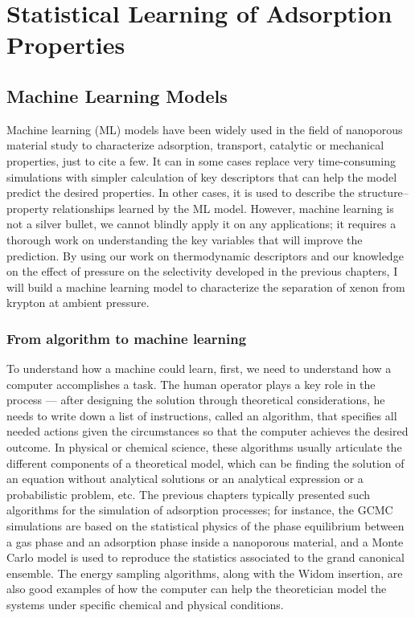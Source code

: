 \documentclass[main]{subfiles}
\begin{document}
\chapter{Statistical Learning of Adsorption Properties}
\vspace*{-1\baselineskip}

\section{Machine Learning Models}

Machine learning (ML) models have been widely used in the field of nanoporous material study to characterize adsorption, transport, catalytic or mechanical properties, just to cite a few. It can in some cases replace very time-consuming simulations with simpler calculation of key descriptors that can help the model predict the desired properties. In other cases, it is used to describe the structure--property relationships learned by the ML model. However, machine learning is not a silver bullet, we cannot blindly apply it on any applications; it requires a thorough work on understanding the key variables that will improve the prediction. By using our work on thermodynamic descriptors and our knowledge on the effect of pressure on the selectivity developed in the previous chapters, I will build a machine learning model to characterize the separation of xenon from krypton at ambient pressure.

\subsection{From algorithm to machine learning}

To understand how a machine could learn, first, we need to understand how a computer accomplishes a task. The human operator plays a key role in the process --- after designing the solution through theoretical considerations, he needs to write down a list of instructions, called an algorithm, that specifies all needed actions given the circumstances so that the computer achieves the desired outcome. In physical or chemical science, these algorithms usually articulate the different components of a theoretical model, which can be finding the solution of an equation without analytical solutions or an analytical expression or a probabilistic problem, etc. The previous chapters typically presented such algorithms for the simulation of adsorption processes; for instance, the GCMC simulations are based on the statistical physics of the phase equilibrium between a gas phase and an adsorption phase inside a nanoporous material, and a Monte Carlo model is used to reproduce the statistics associated to the grand canonical ensemble. The energy sampling algorithms, along with the Widom insertion, are also good examples of how the computer can help the theoretician model the systems under specific chemical and physical conditions. 
\end{document}
